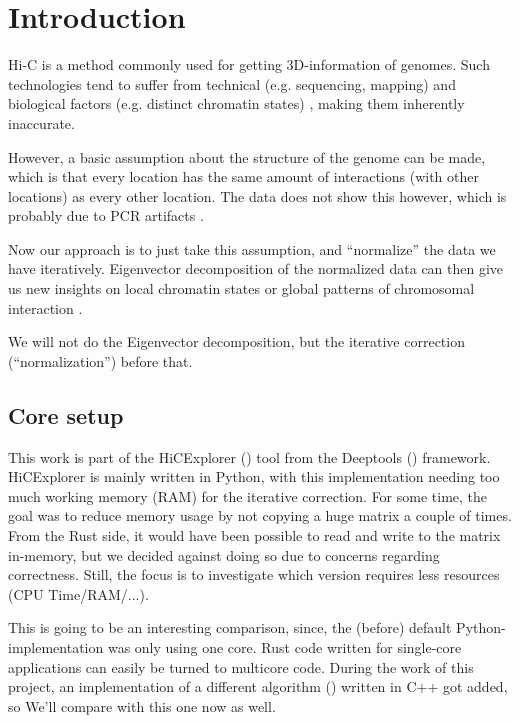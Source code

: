 \chapter{Introduction}\label{chap:introduction}


Hi-C is a method commonly used for getting 3D-information of genomes. Such
technologies tend to suffer from technical (e.g. sequencing, mapping)
\cite{pmid21646344} and biological factors (e.g. distinct chromatin states)
\cite{pmid19693276}, making them inherently inaccurate.

However, a basic assumption about the structure of the genome can be made,
which is that every location has the same amount of interactions (with other
locations) as every other location. The data does not show this however, which
is probably due to PCR artifacts \cite{wingett2015hicup}.

Now our approach is to just take this assumption, and ``normalize'' the data we
have iteratively. Eigenvector decomposition of the normalized data can then
give us new insights on local chromatin states or global patterns of
chromosomal interaction \cite{imakaev2012iterative}.

We will not do the Eigenvector decomposition, but the iterative correction (``normalization'') before that.


\section{Core setup}\label{sec:setup}

This work is part of the HiCExplorer () tool from the
Deeptools () framework. HiCExplorer is mainly written in
Python, with this implementation needing too much working memory (RAM) for the
iterative correction. For some time, the goal was to reduce memory usage by not
copying a huge matrix a couple of times. From the Rust side, it would have been
possible to read and write to the matrix in-memory, but we decided against
doing so due to concerns regarding correctness. Still, the focus is to
investigate which version requires less resources (CPU Time/RAM/...).

This is going to be an interesting comparison, since, the (before) default
Python-implementation was only using one core. Rust code written for
single-core applications can easily be turned to multicore code. During the
work of this project, an implementation of a different algorithm
() written in C++ got added, so We'll compare with this one now
as well.

